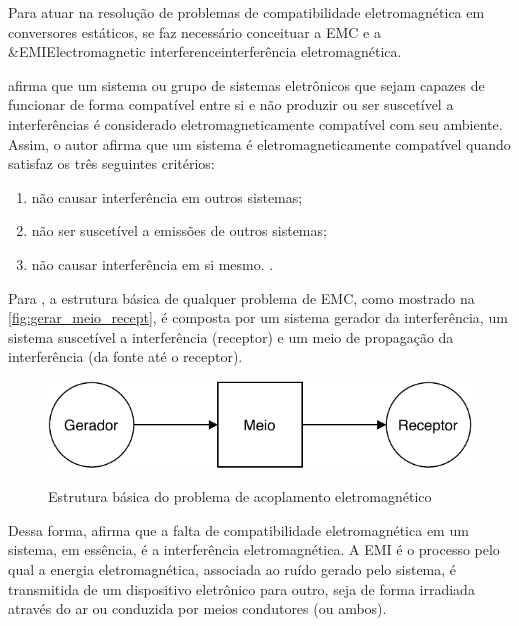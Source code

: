     Para atuar na resolução de problemas de compatibilidade eletromagnética em conversores estáticos, se faz necessário conceituar a EMC e a \abreviatura&{EMI}{Electromagnetic interference}{interferência eletromagnética}.
    
     afirma que um sistema ou grupo de sistemas eletrônicos que sejam capazes de funcionar de forma compatível entre si e não produzir ou ser suscetível a interferências é considerado eletromagneticamente compatível com seu ambiente. Assim, o autor afirma que um sistema é eletromagneticamente compatível quando satisfaz os três seguintes critérios:
    
    \begin{citacao}
        \begin{enumerate}[leftmargin=\leftskip+\labelwidth-\labelsep]
            \item não causar interferência em outros sistemas;
            \item não ser suscetível a emissões de outros sistemas;
            \item não causar interferência em si mesmo. \cite[p.~2, tradução nossa]{ref:EMC_livro_Paul}.
        \end{enumerate}
    \end{citacao}
    
    Para , a estrutura básica de qualquer problema de EMC, como mostrado na \autoref{fig:gerar_meio_recept}, é composta por um sistema gerador da interferência, um sistema suscetível a interferência (receptor) e um meio de propagação da interferência (da fonte até o receptor).
    
    \begin{figure}[H]
    	\centering
    	\caption{Estrutura básica do problema de acoplamento eletromagnético}
    	\includegraphics[scale=1]{pdf/outros/gera_meio_recep.pdf}
    	\label{fig:gerar_meio_recept}
    \end{figure}
    
    Dessa forma,  afirma que a falta de compatibilidade eletromagnética em um sistema, em essência, é a interferência eletromagnética. A EMI é o processo pelo qual a energia eletromagnética, associada ao ruído gerado pelo sistema, é transmitida de um dispositivo eletrônico para outro, seja de forma irradiada através do ar ou conduzida por meios condutores (ou ambos). 
    
